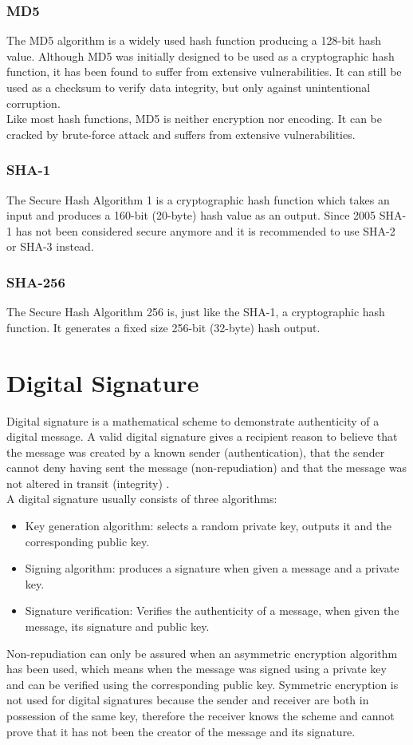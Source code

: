\subsubsection{MD5}
The MD5 algorithm is a widely used hash function producing a 128-bit hash value. Although MD5 was initially designed to be used as a cryptographic hash function, it has been found to suffer from extensive vulnerabilities. It can still be used as a checksum to verify data integrity, but only against unintentional corruption.\\
Like most hash functions, MD5 is neither encryption nor encoding. It can be cracked by brute-force attack and suffers from extensive vulnerabilities. \cite{MD5_Wikipedia}
%
%
\subsubsection{SHA-1}
The Secure Hash Algorithm 1 is a cryptographic hash function which takes an input and produces a 160-bit (20-byte) hash value as an output. Since 2005 SHA-1 has not been considered secure anymore and it is recommended to use SHA-2 or SHA-3 instead. \cite{SHA1_Wikipedia}
%
%
\subsubsection{SHA-256}
The Secure Hash Algorithm 256 is, just like the SHA-1, a cryptographic hash function. It generates a fixed size 256-bit (32-byte) hash output.
%
%
%
\section{Digital Signature}
Digital signature is a mathematical scheme to demonstrate authenticity of a digital message. A valid digital signature gives a recipient reason to believe that the message was created by a known sender (authentication), that the sender cannot deny having sent the message (non-repudiation) and that the message was not altered in transit (integrity) \cite{DigitalSignature_Wikipedia}.\\
A digital signature usually consists of three algorithms:
\begin{itemize}
    \item Key generation algorithm: selects a random private key, outputs it and the corresponding public key.
    \item Signing algorithm: produces a signature when given a message and a private key.
    \item Signature verification: Verifies the authenticity of a message, when given the message, its signature and public key.
\end{itemize}
Non-repudiation can only be assured when an asymmetric encryption algorithm has been used, which means when the message was signed using a private key and can be verified using the corresponding public key. Symmetric encryption is not used for digital signatures because the sender and receiver are both in possession of the same key, therefore the receiver knows the scheme and cannot prove that it has not been the creator of the message and its signature.\\
